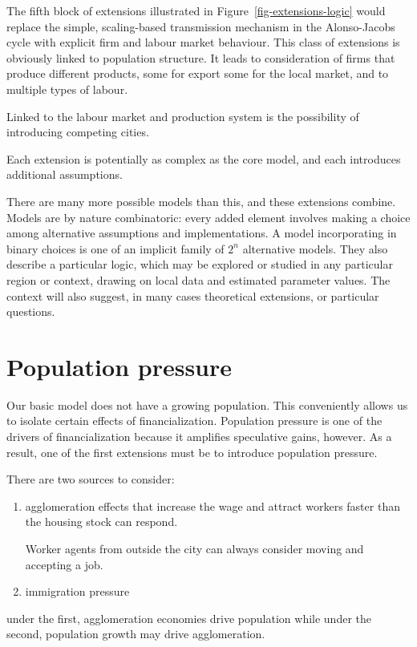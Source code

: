 The fifth block of extensions illustrated in Figure~\ref{fig-extensions-logic} would replace the simple, scaling-based transmission mechanism in the Alonso-Jacobs cycle with explicit firm and labour market behaviour. This class of extensions is obviously linked to population structure. It leads to consideration of firms that produce different products, some for export some for the local market, and to multiple types of labour.

Linked to the labour market and production system is the possibility of introducing competing cities. 

Each extension is potentially as complex as the core model, and each introduces additional assumptions. 

There are many more possible models than this, and these extensions combine. Models are by nature combinatoric: every added element involves making a choice among alternative assumptions and implementations. A model incorporating in binary choices is one of an implicit family of $2^n$ alternative models. 
They also describe a particular logic, which may be explored or studied in any particular region or context, drawing on local data and estimated parameter values. The context will also suggest, in many cases theoretical extensions, or particular questions.

\section{Population pressure} 
Our basic model does not have a growing population. This conveniently allows us to isolate certain effects of financialization. Population pressure is one of the drivers of financialization because it amplifies speculative gains, however. As a result, one of the first extensions must be  to introduce population pressure.

There are two sources to consider: 
\begin{enumerate}
\item agglomeration effects that increase the wage and attract workers faster than the housing stock can respond. 

Worker agents from outside the city can always consider moving and accepting a job. 
\item immigration pressure
\end{enumerate}
under the  first, agglomeration economies drive population while under the second, population growth may drive agglomeration.

